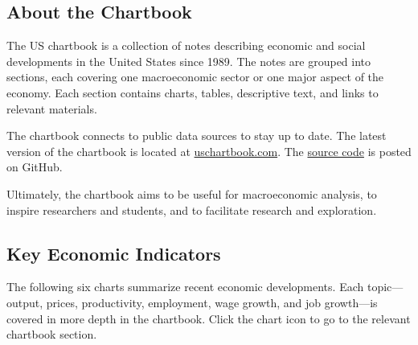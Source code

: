 \subsection*{About the Chartbook}
\uwecpsgr
\begin{minipage}{0.76\textwidth}
The US chartbook is a collection of notes describing economic and social developments in the United States since 1989. The notes are grouped into sections, each covering one macroeconomic sector or one major aspect of the economy. Each section contains charts, tables, descriptive text, and links to relevant materials. 

The chartbook connects to public data sources to stay up to date. The latest version of the chartbook is located at \href{https://www.bd-econ.com/chartbook.html}{uschartbook.com}. The \href{https://github.com/bdecon/US-chartbook}{source code} is posted on GitHub. 

Ultimately, the chartbook aims to be useful for macroeconomic analysis, to inspire researchers and students, and to facilitate research and exploration.
\end{minipage}
\newpage
\thispagestyle{sectpage}
\subsection*{Key Economic Indicators}

\begin{minipage}{0.76\textwidth}
\small The following six charts summarize recent economic developments. Each topic—output, prices, productivity, employment, wage growth, and job growth—is covered in more depth in the chartbook. Click the chart icon \normalsize {\color{blue}\faChartBar[regular]} \small to go to the relevant chartbook section.
\end{minipage}
\vspace{1mm}

